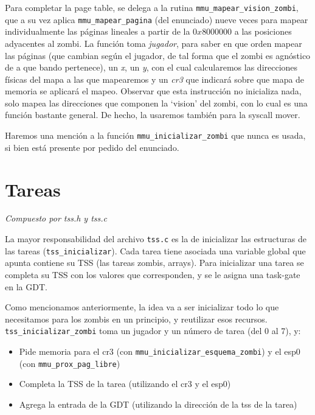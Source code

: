 \documentclass{article}
\begin{document}
	Para completar la page table, se delega a la rutina \texttt{mmu\_mapear\_vision\_zombi}, que a su vez aplica \texttt{mmu\_mapear\_pagina} (del enunciado) nueve veces para mapear individualmente las páginas lineales a partir de la $0x8000000$ a las posiciones adyacentes al zombi. La función toma \textit{jugador}, para saber en que orden mapear las páginas (que cambian según el jugador, de tal forma que el zombi es agnóstico de a que bando pertenece), un \textit{x}, un \textit{y}, con el cual calcularemos las direcciones físicas del mapa a las que mapearemos y un \textit{cr3} que indicará sobre que mapa de memoria se aplicará el mapeo. Observar que esta instrucción no inicializa nada, solo mapea las direcciones que componen la `vision' del zombi, con lo cual es una función bastante general. De hecho, la usaremos también para la syscall mover.
		
	Haremos una mención a la función \texttt{mmu\_inicializar\_zombi} que nunca es usada, si bien está presente por pedido del enunciado.


	\section{Tareas}
	\vspace{-1cm}	
	\begin{flushright}
	\textit{Compuesto por tss.h y tss.c}
	\end{flushright}
	
	La mayor responsabilidad del archivo \texttt{tss.c} es la de inicializar las estructuras de las tareas (\texttt{tss\_inicializar}). Cada tarea tiene asociada una variable global que apunta contiene su TSS (las tareas zombis, arrays). Para inicializar una tarea se completa su TSS con los valores que corresponden, y se le asigna una task-gate en la GDT.
	
	Como mencionamos anteriormente, la idea va a ser inicializar todo lo que necesitamos para los zombis en un principio, y reutilizar esos recursos. \texttt{tss\_inicializar\_zombi} toma un jugador y un número de tarea (del 0 al 7), y:
	
	\begin{itemize}[topsep=0pt]
		\item Pide memoria para el cr3 (con \texttt{mmu\_inicializar\_esquema\_zombi}) y el esp0 (con \texttt{mmu\_prox\_pag\_libre})
		\item Completa la TSS de la tarea (utilizando el cr3 y el esp0)
		\item Agrega la entrada de la GDT (utilizando la dirección de la tss de la tarea)
	\end{itemize}
	
\end{document}
